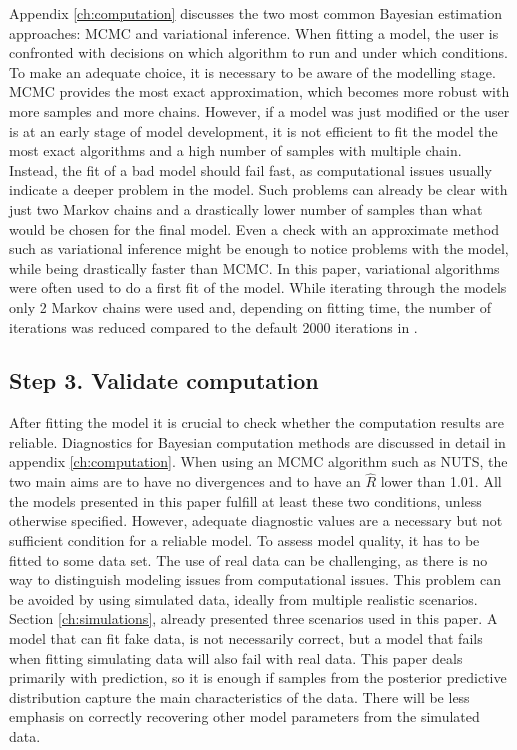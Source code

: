 Appendix \ref{ch:computation} discusses the two most common Bayesian estimation approaches: MCMC and variational inference.
When fitting a model, the user is confronted with decisions on which algorithm to run and under which conditions.
To make an adequate choice, it is necessary to be aware of the modelling stage.
MCMC provides the most exact approximation, which becomes more robust with more samples and more chains.
However, if a model was just modified or the user is at an early stage of model development, it is not efficient to fit the model the most exact algorithms and a high number of samples with multiple chain.
Instead, the fit of a bad model should fail fast, as computational issues usually indicate a deeper problem in the model.
Such problems can already be clear with just two Markov chains and a drastically lower number of samples than what would be chosen for the final model.
Even a check with an approximate method such as variational inference might be enough to notice problems with the model, while being drastically faster than MCMC.
In this paper, variational algorithms were often used to do a first fit of the model.
While iterating through the models only 2 Markov chains were used and, depending on fitting time, the number of iterations was reduced compared to the default 2000 iterations in  \cite{stan_development_team_stan_2021}.


\subsection{Step 3. Validate computation}

After fitting the model it is crucial to check whether the computation results are reliable.
Diagnostics for Bayesian computation methods are discussed in detail in appendix \ref{ch:computation}.
When using an MCMC algorithm such as NUTS, the two main aims are to have no divergences and to have an $\hat R$ lower than 1.01.
All the models presented in this paper fulfill at least these two conditions, unless otherwise specified.
However, adequate diagnostic values are a necessary but not sufficient condition for a reliable model.
To assess model quality, it has to be fitted to some data set.
The use of real data can be challenging, as there is no way to distinguish modeling issues from computational issues.
This problem can be avoided by using simulated data, ideally from multiple realistic scenarios.
Section \ref{ch:simulations}, already presented three scenarios used in this paper.
A model that can fit fake data, is not necessarily correct, but a model that fails when fitting simulating data will also fail with real data.
This paper deals primarily with prediction, so it is enough if samples from the posterior predictive distribution capture the main characteristics of the data.
There will be less emphasis on correctly recovering other model parameters from the simulated data.

